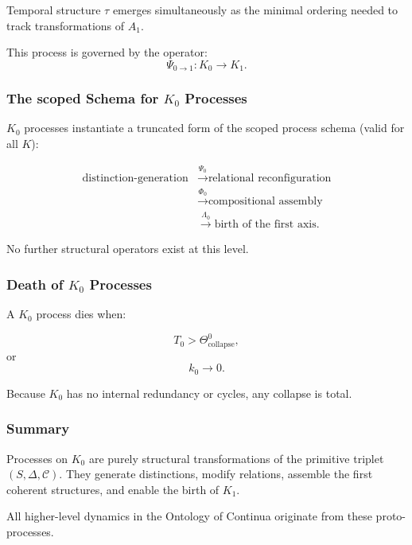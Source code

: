 Temporal structure $\tau$ emerges simultaneously as the minimal ordering
needed to track transformations of $A_1$.

This process is governed by the operator:
\[
\Psi_{0\to1}: K_0 \to K_1.
\]

\subsubsection{The scoped Schema for \texorpdfstring{$K_0$}{K_0} Processes}

$K_0$ processes instantiate a truncated form of the scoped process schema
(valid for all $K$):

\[
\begin{aligned}
\text{distinction-generation}
&\xrightarrow{\Psi_0} \text{relational reconfiguration}\\
&\xrightarrow{\Phi_0} \text{compositional assembly}\\
&\xrightarrow{\Lambda_0} \text{birth of the first axis}.
\end{aligned}
\]

No further structural operators exist at this level.

\subsubsection{Death of \texorpdfstring{$K_0$}{K_0} Processes}

A $K_0$ process dies when:

\[
T_0 > \Theta^0_{\mathrm{collapse}},
\]
or
\[
k_0 \to 0.
\]

Because $K_0$ has no internal redundancy or cycles, any collapse is total.

\subsubsection{Summary}

Processes on $K_0$ are purely structural transformations of the primitive
triplet $(S, \Delta, \mathcal{C})$.
They generate distinctions, modify relations, assemble the first coherent
structures, and enable the birth of $K_1$.

All higher-level dynamics in the Ontology of Continua originate from these
proto-processes.
